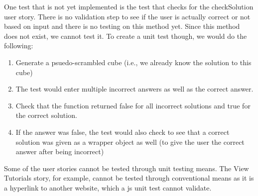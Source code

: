 \documentclass[12pt]{article}
\begin{document}
\par One test that is not yet implemented is the test that checks for the checkSolution user story. There is no validation step to see if the user is actually correct or not based on input and there is no testing on this method yet. Since this method does not exist, we cannot test it. To create a unit test though, we would do the following: \\

\begin{enumerate}
\item Generate a psuedo-scrambled cube (i.e., we already know the solution to this cube)
\item The test would enter multiple incorrect answers as well as the correct answer.
\item Check that the function returned false for all incorrect solutions and true for the correct solution.
\item If the answer was false, the test would also check to see that a correct solution was given as a wrapper object as well (to give the user the correct answer after being incorrect)
\end{enumerate}

\par Some of the user stories cannot be tested through unit testing means. The View Tutorials story, for example, cannot be tested through conventional means as it is a hyperlink to another website, which a js unit test cannot validate. \\
\end{document}
